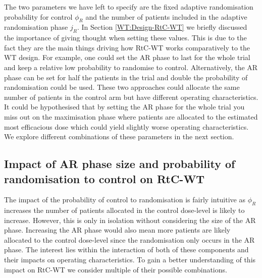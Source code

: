 The two parameters we have left to specify are the fixed adaptive randomisation probability for control $\phi_R$ and the number of patients included in the adaptive randomisation phase $j_R$. In Section \ref{WT:Design-RtC-WT} we briefly discussed the importance of giving thought when setting these values. This is due to the fact they are the main things driving how RtC-WT works comparatively to the WT design. For example, one could set the AR phase to last for the whole trial and keep a relative low probability to randomise to control. Alternatively, the AR phase can be set for half the patients in the trial and double the probability of randomisation could be used. These two approaches could allocate the same number of patients in the control arm but have different operating characteristics. It could be hypothesised that by setting the AR phase for the whole trial you miss out on the maximisation phase where patients are allocated to the estimated most efficacious dose which could yield slightly worse operating characteristics. We explore different combinations of these parameters in the next section. 


\subsection{Impact of AR phase size and probability of randomisation to control on RtC-WT}
\label{WT:Impact-ARandRTCon-RtC-WT}

The impact of the probability of control to randomisation is fairly intuitive as $\phi_R$ increases the number of patients allocated in the control dose-level is likely to increase. However, this is only in isolation without considering the size of the AR phase. Increasing the AR phase would also mean more patients are likely allocated to the control dose-level since the randomisation only occurs in the AR phase. The interest lies within the interaction of both of these components and their impacts on operating characteristics. To gain a better understanding of this impact on RtC-WT we consider multiple of their possible combinations. 

